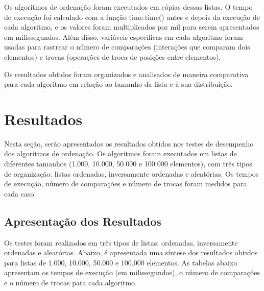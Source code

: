 \documentclass[tcc2]{uftex}
\begin{document}
Os algoritmos de ordenação foram executados em cópias dessas listas. O tempo de execução foi calculado com a função time.time() antes e depois da execução de cada algoritmo, e os valores foram multiplicados por mil para serem apresentados em milissegundos. Além disso, variáveis específicas em cada algoritmo foram usadas para rastrear o número de comparações (interações que comparam dois elementos) e trocas (operações de troca de posições entre elementos).

Os resultados obtidos foram organizados e analisados de maneira comparativa para cada algoritmo em relação ao tamanho da lista e à sua distribuição.

\chapter{Resultados}

Nesta seção, serão apresentados os resultados obtidos nos testes de desempenho dos algoritmos de ordenação. Os algoritmos foram executados em listas de diferentes tamanhos (1.000, 10.000, 50.000 e 100.000 elementos), com três tipos de organização: listas ordenadas, inversamente ordenadas e aleatórias. Os tempos de execução, número de comparações e número de trocas foram medidos para cada caso.

\section{Apresentação dos Resultados}
Os testes foram realizados em três tipos de listas: ordenadas, inversamente ordenadas e aleatórias. Abaixo, é apresentada uma síntese dos resultados obtidos para listas de 1.000, 10.000, 50.000 e 100.000 elementos. As tabelas abaixo apresentam os tempos de execução (em milissegundos), o número de comparações e o número de trocas para cada algoritmo.
\end{document}
